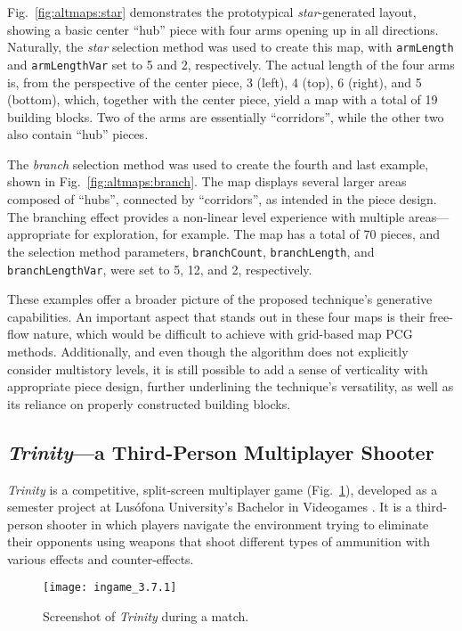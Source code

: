 \documentclass[journal]{IEEEtran}
\begin{document}
Fig.~\ref{fig:altmaps:star} demonstrates the prototypical \textit{star}-generated layout, showing a
basic center ``hub'' piece with four arms opening up in all directions. Naturally, the \textit{star}
selection method was used to create this map, with \texttt{armLength} and \texttt{armLengthVar} set
to 5 and 2, respectively. The actual length of the four arms is, from the perspective of the center
piece, 3 (left), 4 (top), 6 (right), and 5 (bottom), which, together with the center piece, yield a
map with a total of 19 building blocks. Two of the arms are essentially ``corridors'', while the other
two also contain ``hub'' pieces.

The \textit{branch} selection method was used to create the fourth and last example, shown in
Fig.~\ref{fig:altmaps:branch}. The map displays several larger areas composed of ``hubs'', connected
by ``corridors'', as intended in the piece design. The branching effect provides a non-linear level
experience with multiple areas---appropriate for exploration, for example. The map has a total of 70
pieces, and the selection method parameters, \texttt{branchCount}, \texttt{branchLength}, and
\texttt{branchLengthVar}, were set to 5, 12, and 2, respectively.

These examples offer a broader picture of the proposed technique's generative capabilities. An
important aspect that stands out in these four maps is their free-flow nature, which would be
difficult to achieve with grid-based map PCG methods. Additionally, and even though the
algorithm does not explicitly consider multistory levels, it is still possible to add a sense
of verticality with appropriate piece design, further underlining the technique's versatility, as
well as its reliance on properly constructed building blocks.

\subsection{\textit{Trinity}---a Third-Person Multiplayer Shooter}
\label{sec:casestudy:trinity}

\textit{Trinity} is a competitive, split-screen multiplayer game
(Fig.~\ref{fig:ingame}), developed as a semester project at Lusófona University's Bachelor
in Videogames \cite{fachada2020topdown}. It is a third-person shooter in which players
navigate the environment trying to eliminate their opponents using weapons that shoot
different types of ammunition with various effects and counter-effects.

\begin{figure}[!t]
  \centering
  \texttt{[image: ingame\_3.7.1]}
  \caption{Screenshot of \textit{Trinity} during a match.}
  \label{fig:ingame}
\end{figure}
\end{document}

